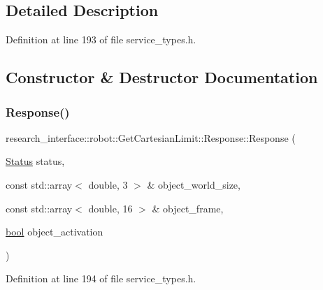 \subsection{Detailed Description}


Definition at line 193 of file service\+\_\+types.\+h.



\subsection{Constructor \& Destructor Documentation}
\mbox{\label{structresearch__interface_1_1robot_1_1GetCartesianLimit_1_1Response_ae2247a577993b9a100333c9eaf15e6e6}} 
\subsubsection{\texorpdfstring{Response()}{Response()}\hspace{0.1cm}{\footnotesize\ttfamily [1/2]}}
{\footnotesize\ttfamily research\+\_\+interface\+::robot\+::\+Get\+Cartesian\+Limit\+::\+Response\+::\+Response (\begin{DoxyParamCaption}\item[{\hyperlink{structresearch__interface_1_1robot_1_1CommandBase_a63ff74649dc636bd79dc0dd34fb84df5}{Status}}]{status,  }\item[{const std\+::array$<$ double, 3 $>$ \&}]{object\+\_\+world\+\_\+size,  }\item[{const std\+::array$<$ double, 16 $>$ \&}]{object\+\_\+frame,  }\item[{\hyperlink{classbool}{bool}}]{object\+\_\+activation }\end{DoxyParamCaption})\hspace{0.3cm}{\ttfamily [inline]}}



Definition at line 194 of file service\+\_\+types.\+h.


